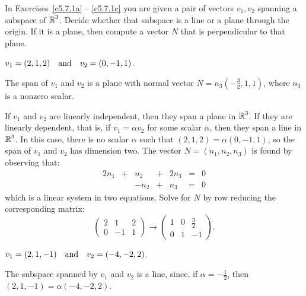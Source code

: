 \documentclass{ximera}
\begin{document}
\noindent In Exercises~\ref{c5.7.1a} -- \ref{c5.7.1c} you are
given a pair of vectors $v_1,v_2$ spanning a subspace of $\mbox{$\Bbb{R}$}^3$.
Decide whether that subspace is a line or a plane through the
origin.  If it is a plane, then compute a vector $N$ that is
perpendicular to that plane.
\begin{exercise} \label{c5.7.1a}
$v_1=(2,1,2) \quad\mbox{and}\quad v_2=(0,-1,1)$.

\begin{solution}

\ans The span of $v_1$ and $v_2$ is a plane with normal vector
$N = n_3(-\frac{3}{2}, 1, 1)$, where $n_3$ is a nonzero scalar.

\soln If $v_1$ and $v_2$ are linearly independent, then they span a plane
in $\mbox{$\Bbb{R}$}^3$.  If they are linearly dependent, that is, if $v_1 =
\alpha v_2$ for some scalar $\alpha$, then they span a line in $\mbox{$\Bbb{R}$}^3$.
In this case, there is no scalar $\alpha$ such that $(2,1,2) =
\alpha(0,-1,1)$, so the span of $v_1$ and $v_2$ has dimension two.
The vector $N = (n_1,n_2,n_3)$ is found by observing that:
\[
\begin{array}{rrrrrcl}
2n_1 & + & n_2 & + & 2n_3 & = & 0 \\
& & -n_2 & + & n_3 & = & 0 \end{array}
\]
which is a linear system in two equations.  Solve for $N$ by row
reducing the corresponding matrix:
\[
\left(\begin{array}{rrr} 2 & 1 & 2 \\ 0 & -1 & 1 \end{array}\right)
\longrightarrow \left(\begin{array}{rrr} 1 & 0 & \frac{3}{2} \\ 0 &
1 & -1 \end{array}\right).
\]

\end{solution}
\end{exercise}
\begin{exercise} \label{c5.7.1b}
$v_1=(2,1,-1) \quad\mbox{and}\quad v_2=(-4,-2,2)$.

\begin{solution}
\ans The subspace spanned by $v_1$ and $v_2$ is a line,
since, if $\alpha = -\frac{1}{2}$, then $(2,1,-1) = \alpha(-4,-2,2)$.

\end{solution}
\end{exercise}
\end{document}

